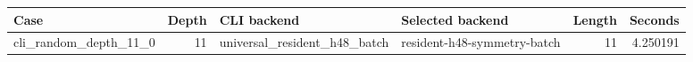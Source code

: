 {\small
\begin{tabular}{lrllrr}
\hline
Case & Depth & CLI backend & Selected backend & Length & Seconds \\
\hline
cli\_random\_depth\_11\_0 & 11 & universal\_resident\_h48\_batch & resident-h48-symmetry-batch & 11 & 4.250191 \\
\hline
\end{tabular}
}
